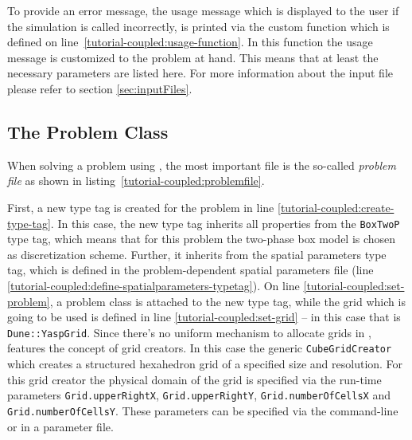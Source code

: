 \begin{lst}\label{tutorial-coupled:parameter-file} \mbox{}

\end{lst}

To provide an error message, the usage message which is displayed to
the user if the simulation is called incorrectly, is printed via the
custom function which is defined on
line~\ref{tutorial-coupled:usage-function}. 
In this function the usage message is customized to the problem at hand. 
This means that at least the necessary parameters are listed here.  
For more information about the input file please refer to section \ref{sec:inputFiles}.


\subsection{The Problem Class}\label{tutorial-coupled:problem}

When solving a problem using \Dumux, the most important file is the
so-called \textit{problem file} as shown in
listing~\ref{tutorial-coupled:problemfile}.

\begin{lst}\label{tutorial-coupled:problemfile} \mbox{}

\end{lst}

First, a new type tag is created for the problem in line
\ref{tutorial-coupled:create-type-tag}.  In this case, the new type
tag inherits all properties from the \texttt{BoxTwoP} type tag, which
means that for this problem the two-phase box model is chosen as
discretization scheme. Further, it inherits from the spatial
parameters type tag, which is defined in the problem-dependent spatial
parameters file (line
\ref{tutorial-coupled:define-spatialparameters-typetag}).  On line
\ref{tutorial-coupled:set-problem}, a problem class is attached to the
new type tag, while the grid which is going to be used is defined in
line \ref{tutorial-coupled:set-grid} -- in this case that is
\texttt{Dune::YaspGrid}.  Since there's no uniform mechanism to
allocate grids in \Dune, \Dumux features the concept of grid creators.
In this case the generic \texttt{CubeGridCreator} which creates a
structured hexahedron grid of a specified size and resolution. For
this grid creator the  physical domain of the grid is specified via the
run-time parameters \texttt{Grid.upperRightX},
\texttt{Grid.upperRightY}, \texttt{Grid.numberOfCellsX} and
\texttt{Grid.numberOfCellsY}. These parameters can be specified via
the command-line or in a parameter file.

